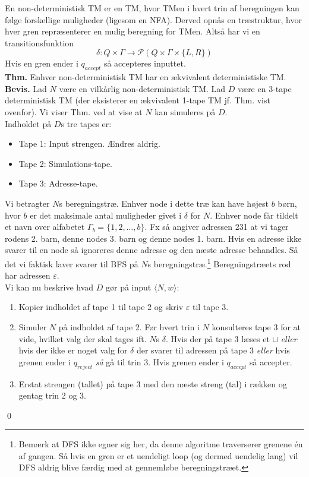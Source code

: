 En non-deterministisk TM er en TM, hvor TMen i hvert trin af beregningen kan følge forskellige muligheder (ligesom en NFA). Derved opnås en træstruktur, hvor hver gren repræsenterer en mulig beregning for TMen. Altså har vi en transitionsfunktion 
$$\delta: Q \times \Gamma \rightarrow \mathcal{P}(Q \times \Gamma \times \{L,R\})$$
Hvis en gren ender i $q_{accept}$ så accepteres inputtet. \\

\textbf{Thm.} Enhver non-deterministisk TM har en ækvivalent deterministiske TM. \\

\textbf{Bevis.} Lad $N$ være en vilkårlig non-deterministisk TM. Lad $D$ være en 3-tape deterministisk TM (der eksisterer en ækvivalent 1-tape TM jf. Thm. vist ovenfor). Vi viser Thm. ved at vise at $N$ kan simuleres på $D$. \\

Indholdet på $D$s tre tapes er:
\begin{itemize}
	\item Tape 1: Input strengen. Ændres aldrig.
	\item Tape 2: Simulations-tape.
	\item Tape 3: Adresse-tape.
\end{itemize}  
Vi betragter $N$s beregningstræ. Enhver node i dette træ kan have højest $b$ børn, hvor $b$ er det maksimale antal muligheder givet i $\delta$ for $N$. Enhver node får tildelt et navn over alfabetet $\Gamma_b=\{1,2,\ldots,b\}$. Fx så angiver adressen 231 at vi tager rodens 2. barn, denne nodes 3. barn og denne nodes 1. barn. Hvis en adresse ikke svarer til en node så ignoreres denne adresse og den næste adresse behandles. Så det vi faktisk laver svarer til BFS på $N$s beregningstræ.\footnote{Bemærk at DFS ikke egner sig her, da denne algoritme traverserer grenene én af gangen. Så hvis en gren er et uendeligt loop (og dermed uendelig lang) vil DFS aldrig blive færdig med at gennemløbe beregningstræet.} Beregningstræets rod har adressen $\varepsilon$. \\

Vi kan nu beskrive hvad $D$ gør på input $\langle N, w \rangle$:
\begin{enumerate}
	\item Kopier indholdet af tape 1 til tape 2 og skriv $\varepsilon$ til tape 3. 
	\item Simuler $N$ på indholdet af tape 2. Før hvert trin i $N$ konsulteres tape 3 for at vide, hvilket valg der skal tages ift. $N$s $\delta$. Hvis der på tape 3 læses et $\sqcup$ \textit{eller} hvis der ikke er noget valg for $\delta$ der svarer til adressen på tape 3 \textit{eller} hvis grenen ender i $q_{reject}$ \textit{så} gå til trin 3. Hvis grenen ender i $q_{accept}$ så accepter. 
	\item Erstat strengen (tallet) på tape 3 med den næste streng (tal) i rækken og gentag trin 2 og 3. 
\end{enumerate}
\begin{flushright}
	\qed
\end{flushright}

